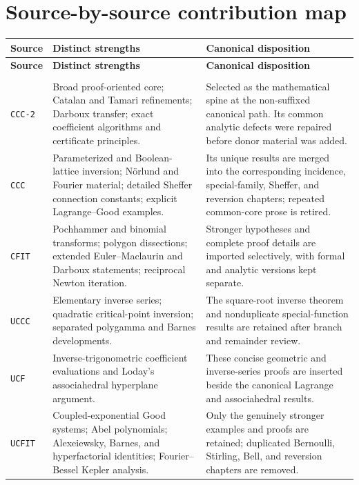 \documentclass[11pt,a4paper,oneside,openany]{book}
\theoremstyle{definition}
\theoremstyle{remark}
\begin{document}
\section{Source-by-source contribution map}

\renewcommand{\arraystretch}{1.15}
\begin{longtable}{>{\raggedright\arraybackslash}p{}
                  >{\raggedright\arraybackslash}p{}
                  >{\raggedright\arraybackslash}p{}}
\toprule
\textbf{Source} & \textbf{Distinct strengths} & \textbf{Canonical disposition}\\
\midrule
\endfirsthead
\toprule
\textbf{Source} & \textbf{Distinct strengths} & \textbf{Canonical disposition}\\
\midrule
\endhead
\midrule
\multicolumn{3}{r}{\small Continued on the next page}\\
\endfoot
\bottomrule
\endlastfoot

\texttt{CCC-2}
& Broad proof-oriented core; Catalan and Tamari refinements; Darboux transfer;
  exact coefficient algorithms and certificate principles.
& Selected as the mathematical spine at the non-suffixed canonical path.  Its
  common analytic defects were repaired before donor material was added.\\[1ex]

\texttt{CCC}
& Parameterized and Boolean-lattice inversion; N\"orlund and Fourier material;
  detailed Sheffer connection constants; explicit Lagrange--Good examples.
& Its unique results are merged into the corresponding incidence, special-family,
  Sheffer, and reversion chapters; repeated common-core prose is retired.\\[1ex]

\texttt{CFIT}
& Pochhammer and binomial transforms; polygon dissections; extended
  Euler--Maclaurin and Darboux statements; reciprocal Newton iteration.
& Stronger hypotheses and complete proof details are imported selectively, with
  formal and analytic versions kept separate.\\[1ex]

\texttt{UCCC}
& Elementary inverse series; quadratic critical-point inversion; separated
  polygamma and Barnes developments.
& The square-root inverse theorem and nonduplicate special-function results are
  retained after branch and remainder review.\\[1ex]

\texttt{UCF}
& Inverse-trigonometric coefficient evaluations and Loday's associahedral
  hyperplane argument.
& These concise geometric and inverse-series proofs are inserted beside the
  canonical Lagrange and associahedral results.\\[1ex]

\texttt{UCFIT}
& Coupled-exponential Good systems; Abel polynomials; Alexeiewsky, Barnes, and
  hyperfactorial identities; Fourier--Bessel Kepler analysis.
& Only the genuinely stronger examples and proofs are retained; duplicated
  Bernoulli, Stirling, Bell, and reversion chapters are removed.\\
\end{longtable}
\renewcommand{\arraystretch}{1}
\end{document}
